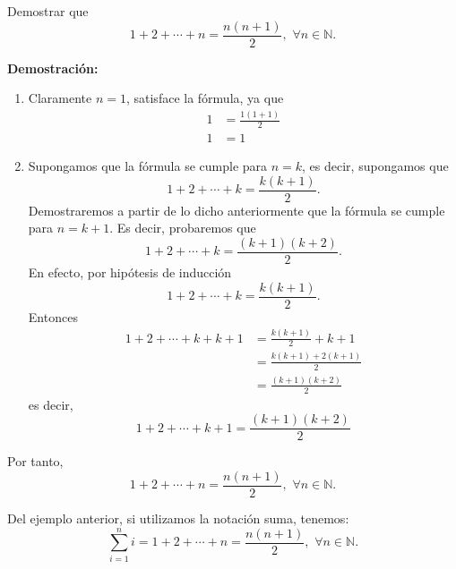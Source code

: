 \begin{myexample}
    Demostrar que
    $$1+2+\cdots +n=\frac{n(n+1)}{2}, \,\, \forall n \in \mathbb{N}.$$
    
    \tcblower
    \textbf{\color{jblueleft}Demostración:}
    \begin{enumerate}[label=\roman*)]
        \item Claramente $n=1$, satisface la fórmula, ya que
        \begin{align*}
            1 &=\frac{1(1+1)}{2} \\
            1 &=1
        \end{align*}
        \item Supongamos que la fórmula se cumple para $n=k$, es decir, supongamos que
        $$1+2+\cdots +k=\frac{k(k+1)}{2}.$$
        Demostraremos a partir de lo dicho anteriormente que la fórmula se cumple para $n=k+1$. Es decir, probaremos que
        $$1+2+\cdots +k=\frac{(k+1)(k+2)}{2}.$$
        En efecto, por hipótesis de inducción
        $$1+2+\cdots +k=\frac{k(k+1)}{2}.$$
        Entonces
        \begin{align*}
            1+2+\cdots +k+k+1 &=\frac{k(k+1)}{2}+k+1 \\
            &=\frac{k(k+1)+2(k+1)}{2} \\
            &=\frac{(k+1)(k+2)}{2}
        \end{align*}
        es decir,
        $$1+2+\cdots +k+1=\frac{(k+1)(k+2)}{2}$$
    \end{enumerate}
    Por tanto,
    $$1+2+\cdots +n=\frac{n(n+1)}{2}, \,\, \forall n \in \mathbb{N}.$$
\end{myexample}

\begin{BOX}
    Del ejemplo anterior, si utilizamos la notación suma, tenemos:
    $$\sum_{i=1}^n i = 1+2+\cdots +n = \frac{n(n+1)}{2}, \,\, \forall n \in \mathbb{N}.$$
\end{BOX}

